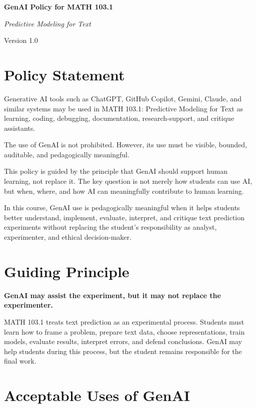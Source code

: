 \documentclass[11pt]{article}
\newcommand{\coursecode}{MATH 103.1}
\newcommand{\coursetitle}{Predictive Modeling for Text}
\newcommand{\policytitle}{GenAI Policy for \coursecode}
\begin{document}
\begin{center}
    {\Large\bfseries \policytitle}\par
    \vspace{0.25em}
    {\large \textit{\coursetitle}}\par
    \vspace{0.5em}
    {Version 1.0}
\end{center}

\section*{Policy Statement}

Generative AI tools such as ChatGPT, GitHub Copilot, Gemini, Claude, and similar systems may be used in \coursecode: \coursetitle{} as learning, coding, debugging, documentation, research-support, and critique assistants.

The use of GenAI is not prohibited. However, its use must be visible, bounded, auditable, and pedagogically meaningful.

This policy is guided by the principle that GenAI should support human learning, not replace it. The key question is not merely how students can use AI, but when, where, and how AI can meaningfully contribute to human learning.

In this course, GenAI use is pedagogically meaningful when it helps students better understand, implement, evaluate, interpret, and critique text prediction experiments without replacing the student's responsibility as analyst, experimenter, and ethical decision-maker.

\section{Guiding Principle}

\textbf{GenAI may assist the experiment, but it may not replace the experimenter.}

\coursecode{} treats text prediction as an experimental process. Students must learn how to frame a problem, prepare text data, choose representations, train models, evaluate results, interpret errors, and defend conclusions. GenAI may help students during this process, but the student remains responsible for the final work.

\section{Acceptable Uses of GenAI}
\end{document}
